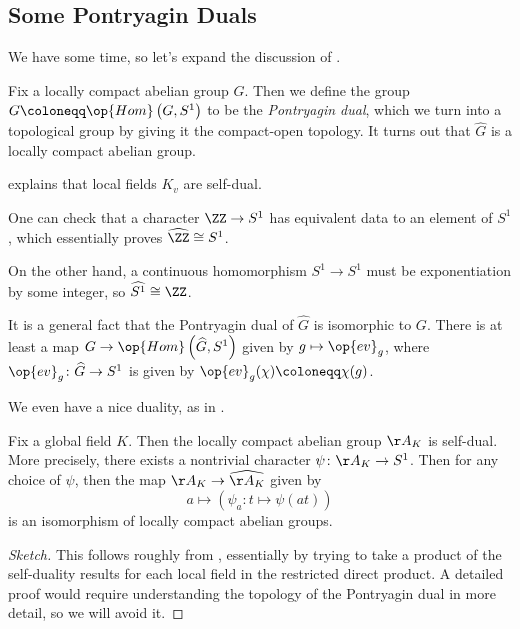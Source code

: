 \documentclass{article}
\begin{document}
\subsection{Some Pontryagin Duals}
We have some time, so let's expand the discussion of .
\begin{definition}
	Fix a locally compact abelian group $G$. Then we define the group $G\coloneqq\op{Hom}\left(G,S^1\right)$ to be the \textit{Pontryagin dual}, which we turn into a topological group by giving it the compact-open topology. It turns out that $\widehat G$ is a locally compact abelian group.
\end{definition}
\begin{example}
	 explains that local fields $K_v$ are self-dual.
\end{example}
\begin{example}
	One can check that a character $\ZZ\to S^1$ has equivalent data to an element of $S^1$, which essentially proves $\widehat{\ZZ}\cong S^1$.
\end{example}
\begin{example}
	On the other hand, a continuous homomorphism $S^1\to S^1$ must be exponentiation by some integer, so $\widehat{S^1}\cong\ZZ$.
\end{example}
\begin{remark}
	It is a general fact that the Pontryagin dual of $\widehat G$ is isomorphic to $G$. There is at least a map $G\to\op{Hom}\left(\widehat G,S^1\right)$ given by $g\mapsto\op{ev}_g$, where $\op{ev}_g\colon\widehat G\to S^1$ is given by $\op{ev}_g(\chi)\coloneqq\chi(g)$.
\end{remark}
We even have a nice duality, as in .
\begin{theorem} \label{thm:adele-self-dual}
	Fix a global field $K$. Then the locally compact abelian group $\AA_K$ is self-dual. More precisely, there exists a nontrivial character $\psi\colon\AA_K\to S^1$. Then for any choice of $\psi$, then the map $\AA_K\to\widehat{\AA_K}$ given by
	\[a\mapsto(\psi_a\colon t\mapsto\psi(at))\]
	is an isomorphism of locally compact abelian groups.
\end{theorem}
\begin{proof}[Sketch]
	This follows roughly from , essentially by trying to take a product of the self-duality results for each local field in the restricted direct product. A detailed proof would require understanding the topology of the Pontryagin dual in more detail, so we will avoid it.
\end{proof}
\end{document}
